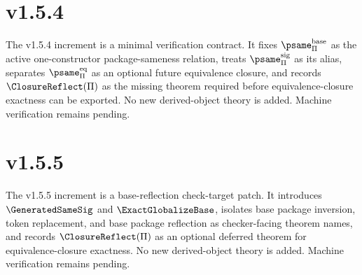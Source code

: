 \section*{v1.5.4}
The v1.5.4 increment is a minimal verification contract. It fixes \(\psame_{\Pi}^{\mathrm{base}}\) as the active one-constructor package-sameness relation, treats \(\psame_{\Pi}^{\mathrm{sig}}\) as its alias, separates \(\psame_{\Pi}^{\mathrm{eq}}\) as an optional future equivalence closure, and records \(\ClosureReflect(\Pi)\) as the missing theorem required before equivalence-closure exactness can be exported. No new derived-object theory is added. Machine verification remains pending.


\section*{v1.5.5}
The v1.5.5 increment is a base-reflection check-target patch. It introduces \(\GeneratedSameSig\) and \(\ExactGlobalizeBase\), isolates base package inversion, token replacement, and base package reflection as checker-facing theorem names, and records \(\ClosureReflect(\Pi)\) as an optional deferred theorem for equivalence-closure exactness. No new derived-object theory is added. Machine verification remains pending.

